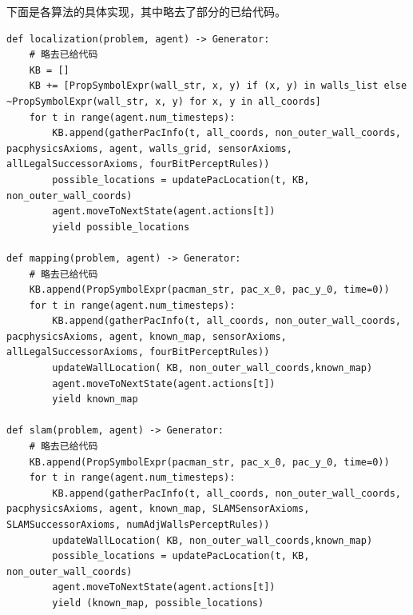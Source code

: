 下面是各算法的具体实现，其中略去了部分的已给代码。
\begin{lstlisting}[emph={[3]problem,agent},emphstyle={[3]\color{vscode_parametercolor}},emph={[4]Generator,Expr,SearchProblem,Callable,Node,Actions,Reached,Any,List,Tuple},emphstyle={[4]\color{vscode_classcolor}}]
def localization(problem, agent) -> Generator:
    # 略去已给代码
    KB = []
    KB += [PropSymbolExpr(wall_str, x, y) if (x, y) in walls_list else ~PropSymbolExpr(wall_str, x, y) for x, y in all_coords]
    for t in range(agent.num_timesteps):
        KB.append(gatherPacInfo(t, all_coords, non_outer_wall_coords, pacphysicsAxioms, agent, walls_grid, sensorAxioms, allLegalSuccessorAxioms, fourBitPerceptRules))
        possible_locations = updatePacLocation(t, KB, non_outer_wall_coords)
        agent.moveToNextState(agent.actions[t])
        yield possible_locations

def mapping(problem, agent) -> Generator:
    # 略去已给代码
    KB.append(PropSymbolExpr(pacman_str, pac_x_0, pac_y_0, time=0))
    for t in range(agent.num_timesteps):
        KB.append(gatherPacInfo(t, all_coords, non_outer_wall_coords, pacphysicsAxioms, agent, known_map, sensorAxioms, allLegalSuccessorAxioms, fourBitPerceptRules))
        updateWallLocation( KB, non_outer_wall_coords,known_map)
        agent.moveToNextState(agent.actions[t])
        yield known_map

def slam(problem, agent) -> Generator:
    # 略去已给代码
    KB.append(PropSymbolExpr(pacman_str, pac_x_0, pac_y_0, time=0))
    for t in range(agent.num_timesteps):
        KB.append(gatherPacInfo(t, all_coords, non_outer_wall_coords, pacphysicsAxioms, agent, known_map, SLAMSensorAxioms, SLAMSuccessorAxioms, numAdjWallsPerceptRules))
        updateWallLocation( KB, non_outer_wall_coords,known_map)
        possible_locations = updatePacLocation(t, KB, non_outer_wall_coords)
        agent.moveToNextState(agent.actions[t])
        yield (known_map, possible_locations)
\end{lstlisting}
